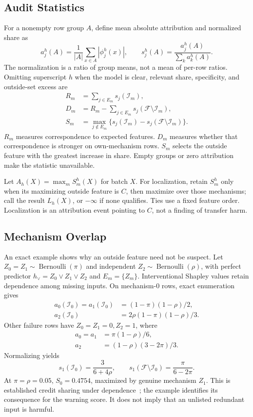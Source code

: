 \documentclass[conference]{IEEEtran}
\begin{document}
\subsection{Audit Statistics}
For a nonempty row group $A$, define mean absolute attribution and normalized share as
\begin{equation}
 a_j^h(A)=\frac{1}{|A|}\sum_{x\in A}|\phi_j^h(x)|,
 \qquad s_j^h(A)=\frac{a_j^h(A)}{\sum_k a_k^h(A)}.
\end{equation}
The normalization is a ratio of group means, not a mean of per-row ratios. Omitting superscript $h$ when the model is clear, relevant share, specificity, and outside-set excess are
\begin{align}
 R_m&=\sum_{j\in E_m}s_j(\mathcal I_m),\\
 D_m&=R_m-\sum_{j\in E_m}s_j(\mathcal F\setminus\mathcal I_m),\\
 S_m&=\max_{j\notin E_m}\{s_j(\mathcal I_m)-s_j(\mathcal F\setminus\mathcal I_m)\}.
 \label{eq:outside}
\end{align}
$R_m$ measures correspondence to expected features. $D_m$ measures whether that correspondence is stronger on own-mechanism rows. $S_m$ selects the outside feature with the greatest increase in share. Empty groups or zero attribution make the statistic unavailable.

Let $A_h(X)=\max_m S_m^h(X)$ for batch $X$. For localization, retain $S_m^h$ only when its maximizing outside feature is $C$, then maximize over those mechanisms; call the result $L_h(X)$, or $-\infty$ if none qualifies. Ties use a fixed feature order. Localization is an attribution event pointing to $C$, not a finding of transfer harm.

\subsection{Mechanism Overlap}
An exact example shows why an outside feature need not be suspect. Let $Z_0=Z_1\sim\operatorname{Bernoulli}(\pi)$ and independent $Z_2\sim\operatorname{Bernoulli}(\rho)$, with perfect predictor $h_\lor=Z_0\lor Z_1\lor Z_2$ and $E_m=\{Z_m\}$. Interventional Shapley values retain dependence among missing inputs. On mechanism-0 rows, exact enumeration gives
\begin{align}
 a_0(\mathcal I_0)=a_1(\mathcal I_0)&=(1-\pi)(1-\rho)/2,\\
 a_2(\mathcal I_0)&=2\rho(1-\pi)(1-\rho)/3.
\end{align}
Other failure rows have $Z_0=Z_1=0,Z_2=1$, where
\begin{align}
 a_0=a_1&=\pi(1-\rho)/6,\\
 a_2&=(1-\rho)(3-2\pi)/3.
\end{align}
Normalizing yields
\begin{equation}
 s_1(\mathcal I_0)=\frac{3}{6+4\rho},\qquad
 s_1(\mathcal F\setminus\mathcal I_0)=\frac{\pi}{6-2\pi}.
\end{equation}
At $\pi=\rho=0.05$, $S_0=0.4754$, maximized by genuine mechanism $Z_1$. This is established credit sharing under dependence~\cite{janzing2020feature,kumar2020problems}; the example identifies its consequence for the warning score. It does not imply that an unlisted redundant input is harmful.
\end{document}

